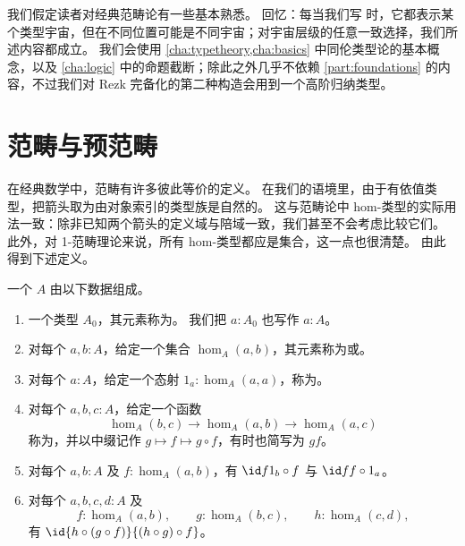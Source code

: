 我们假定读者对经典范畴论有一些基本熟悉。
回忆：每当我们写 \type 时，它都表示某个类型宇宙，但在不同位置可能是不同宇宙；对宇宙层级的任意一致选择，我们所述内容都成立。
我们会使用 \cref{cha:typetheory,cha:basics} 中同伦类型论的基本概念，以及 \cref{cha:logic} 中的命题截断；除此之外几乎不依赖 \cref{part:foundations} 的内容，不过我们对 Rezk 完备化的第二种构造会用到一个高阶归纳类型。

\section{范畴与预范畴}
\label{sec:cats}

在经典数学中，范畴有许多彼此等价的定义。
在我们的语境里，由于有依值类型，把箭头取为由对象索引的类型族是自然的。
这与范畴论中 hom-类型的实际用法一致：除非已知两个箭头的定义域与陪域一致，我们甚至不会考虑比较它们。
此外，对 1-范畴理论来说，所有 hom-类型都应是集合，这一点也很清楚。
由此得到下述定义。

\begin{defn}\label{ct:precategory}
  一个
  $A$ 由以下数据组成。
  \begin{enumerate}
  \item 一个类型 $A_0$，其元素称为。%
    我们把 $a:A_0$ 也写作 $a:A$。
  \item 对每个 $a,b:A$，给定一个集合 $\hom_A(a,b)$，其元素称为或。%
  \item 对每个 $a:A$，给定一个态射 $1_a:\hom_A(a,a)$，称为。%
  \item 对每个 $a,b,c:A$，给定一个函数%
    \[  \hom_A(b,c) \to \hom_A(a,b) \to \hom_A(a,c) \]
    称为，并以中缀记作 $g\mapsto f\mapsto g\circ f$，有时也简写为 $gf$。
  \item 对每个 $a,b:A$ 及 $f:\hom_A(a,b)$，有 $\id f {1_b\circ f}$ 与 $\id f {f\circ 1_a}$。
  \item 对每个 $a,b,c,d:A$ 及
    \begin{equation*}
      f:\hom_A(a,b), \qquad
      g:\hom_A(b,c), \qquad
      h:\hom_A(c,d),
    \end{equation*}
    有 $\id {h\circ (g\circ f)}{(h\circ g)\circ f}$。
  \end{enumerate}
\end{defn}

